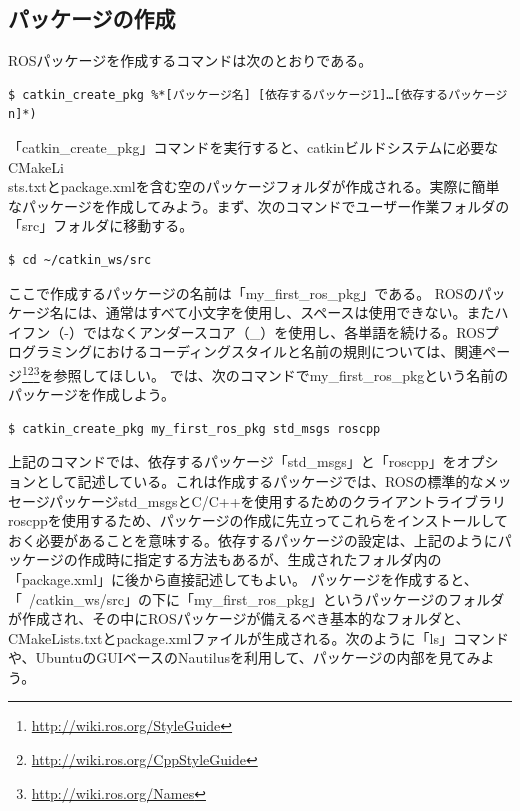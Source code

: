 \subsection{パッケージの作成}
ROSパッケージを作成するコマンドは次のとおりである。

\begin{lstlisting}[language=ROS]
$ catkin_create_pkg %*[パッケージ名] [依存するパッケージ1]…[依存するパッケージn]*)
\end{lstlisting}



「catkin\_create\_pkg」コマンドを実行すると、catkinビルドシステムに必要なCMakeLi\\sts.txtとpackage.xmlを含む空のパッケージフォルダが作成される。実際に簡単なパッケージを作成してみよう。まず、次のコマンドでユーザー作業フォルダの「src」フォルダに移動する。

\begin{lstlisting}[language=ROS]
$ cd ~/catkin_ws/src
\end{lstlisting}

ここで作成するパッケージの名前は「my\_first\_ros\_pkg」である。 ROSのパッケージ名には、通常はすべて小文字を使用し、スペースは使用できない。またハイフン（-）ではなくアンダースコア（\_）を使用し、各単語を続ける。ROSプログラミングにおけるコーディングスタイルと名前の規則については、関連ページ\footnote{\url{http://wiki.ros.org/StyleGuide}}\footnote{\url{http://wiki.ros.org/CppStyleGuide}}\footnote{\url{http://wiki.ros.org/Names}}を参照してほしい。
では、次のコマンドでmy\_first\_ros\_pkgという名前のパッケージを作成しよう。

\begin{lstlisting}[language=ROS]
$ catkin_create_pkg my_first_ros_pkg std_msgs roscpp
\end{lstlisting}

上記のコマンドでは、依存するパッケージ「std\_msgs」と「roscpp」をオプションとして記述している。これは作成するパッケージでは、ROSの標準的なメッセージパッケージstd\_msgsとC/C++を使用するためのクライアントライブラリroscppを使用するため、パッケージの作成に先立ってこれらをインストールしておく必要があることを意味する。依存するパッケージの設定は、上記のようにパッケージの作成時に指定する方法もあるが、生成されたフォルダ内の「package.xml」に後から直接記述してもよい。
パッケージを作成すると、「~/catkin\_ws/src」の下に「my\_first\_ros\_pkg」というパッケージのフォルダが作成され、その中にROSパッケージが備えるべき基本的なフォルダと、CMakeLists.txtとpackage.xmlファイルが生成される。次のように「ls」コマンドや、UbuntuのGUIベースのNautilusを利用して、パッケージの内部を見てみよう。

